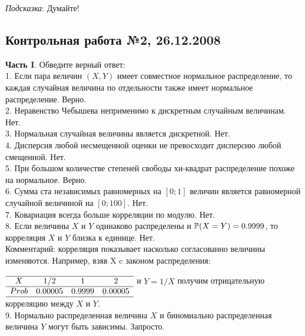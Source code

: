 \documentclass[12pt, a4paper]{article}\usepackage[]{graphicx}\usepackage[]{color}
\begin{document}
\emph{Подсказка}: Думайте! \\

\subsection{Контрольная работа №2, 26.12.2008}

\textbf{Часть I}. Обведите верный ответ: \\

1. Если пара величин $(X,Y)$ имеет совместное нормальное распределение, то каждая случайная величина по отдельности также имеет нормальное распределение. Верно. \\

2. Неравенство Чебышева неприменимо к дискретным случайным величинам. Нет. \\

3. Нормальная случайная величины является дискретной. Нет.
\\

4. Дисперсия любой несмещенной оценки не превосходит дисперсию любой смещенной. Нет. \\

5. При большом количестве степеней свободы хи-квадрат распределение похоже на нормальное. Верно. \\

6. Сумма ста независимых равномерных на $[0;1]$ величин является равномерной случайной величиной на $[0;100]$. Нет. \\

7. Ковариация всегда больше корреляции по модулю.  Нет. \\

8. Если величины $X$ и $Y$ одинаково распределены и $\P(X=Y)=0.9999$, то корреляция $X$ и $Y$ близка к единице. Нет. \\
Комментарий: корреляция показывает насколько согласованно величины изменяются. Например, взяв X c законом распределения: \\
$\begin{array}{cccc} \\
\hline
X & 1/2 & 1 & 2 \\
\hline
Prob & 0.00005 & 0.9999 & 0.00005 \\
\hline
\end{array}$
и $Y=1/X$ получим отрицательную корреляцию между $X$ и $Y$. \\

9. Нормально распределенная величина $X$ и биномиально распределенная величина $Y$ могут быть зависимы. Запросто. \\
\end{document}

